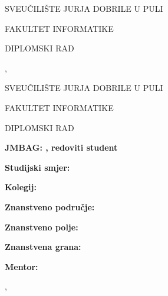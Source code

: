 \begin{titlepage}
\thispagestyle{empty}
\begin{center}
SVEUČILIŠTE JURJA DOBRILE U PULI

FAKULTET INFORMATIKE

\vspace{45mm}

\textbf{\radAutor}

\vspace{20mm}

\textbf{\radNaslov}

\vspace{5mm}
DIPLOMSKI RAD

\vfill

\radMjesto, \radGodina
\end{center}
\end{titlepage}

\begin{titlepage}
\thispagestyle{empty}
\begin{center}
SVEUČILIŠTE JURJA DOBRILE U PULI

FAKULTET INFORMATIKE

\vspace{45mm}

\textbf{\radAutor}

\vspace{20mm}

\textbf{\radNaslov}

\vspace{5mm}
DIPLOMSKI RAD

\end{center}

\vspace{45mm}

\textbf{JMBAG: \radJmbag, redoviti student}

\textbf{Studijski smjer: \nazivStudija}
\bigskip

\textbf{Kolegij: \radPredmet}

\textbf{Znanstveno područje: \radPodrucje}

\textbf{Znanstveno polje: \radPolje}

\textbf{Znanstvena grana: \radGrana}
\bigskip

\textbf{Mentor: \radMentor}

\vfill

\begin{center}

\radMjesto, \radGodina

\end{center}
\end{titlepage}
